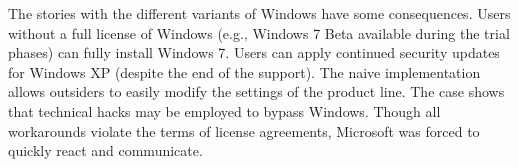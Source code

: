 \wprv
% 
 The stories with the different variants of Windows have some consequences. Users without a full license of Windows (e.g., Windows 7 Beta available during the trial phases) can fully install Windows 7. Users can apply continued security updates for Windows XP (despite the end of the support).
The naive implementation allows outsiders to easily modify the settings of the product line. The case shows that technical hacks may be employed to bypass Windows. Though all workarounds violate the terms of license agreements, Microsoft was forced to quickly react and communicate.  

 